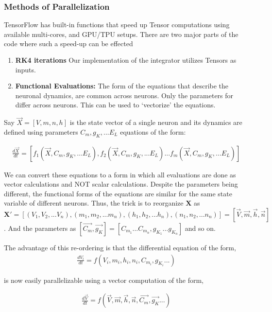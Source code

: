 \documentclass[10pt,letterpaper]{article}
\begin{document}
\subsubsection*{Methods of Parallelization}
TensorFlow has built-in functions that speed up Tensor computations using available multi-cores, and GPU/TPU setups. There are two major parts of the code where such a speed-up can be effected
\begin{enumerate}
\item \textbf{RK4 iterations} Our implementation of the integrator utilizes Tensors as inputs. 
\item \textbf{Functional Evaluations:} The form of the equations that describe the neuronal dynamics,  are common across neurons. Only the parameters for differ across neurons. This can be used to `vectorize' the equations.
\end{enumerate}

Say $\vec{X}=[V,m,n,h]$ is the state vector of a single neuron and its dynamics are defined using parameters $C_m,g_K,...E_L$ equations of the form: 

\begin{eqnarray}\frac{d\vec{X}}{dt} = [f_1(\vec{X},C_m,g_K,...E_L),f_2(\vec{X},C_m,g_K,...E_L)...f_m(\vec{X},C_m,g_K,...E_L)]\end{eqnarray}

We can convert these equations to a form in which all evaluations are done as vector calculations and NOT scalar calculations. Despite the parameters being different, the functional forms of the equations are similar for the same state variable of different neurons. Thus, the trick is to reorganize $\mathbf{X}$ as $\mathbf{X'}=[(V_1,V_2,...V_n),(m_1,m_2,...m_n),(h_1,h_2,...h_n),(n_1,n_2,...n_n)]=[\vec{V},\vec{m},\vec{h},\vec{n}]$. And the parameters as $[\vec{C_m},\vec{g_K}] = [C_{m_{1}}\dots C_{m_{n}},g_{K_{1}}\dots g_{K_{n}}]$ and so on.

The advantage of this re-ordering is that the differential equation of the form,
\begin{eqnarray}\frac{dV_i}{dt}=f(V_i,m_i,h_i,n_i,C_{m_i},g_{K_i}...)\end{eqnarray}

is now easily parallelizable using a vector computation of the form, 

\begin{eqnarray}\frac{d\vec{V}}{dt}=f(\vec{V},\vec{m},\vec{h},\vec{n},\vec{C_m},\vec{g_K}...)\end{eqnarray}
\end{document}
